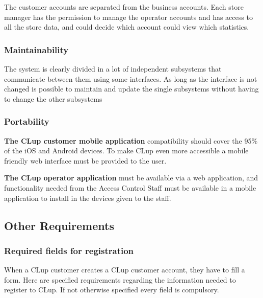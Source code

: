The customer accounts are separated from the business accounts. Each store manager has the permission to manage the operator accounts and has access to all the store data, and could decide which account could view which statistics.
\subsubsection{Maintainability}
The system is clearly divided in a lot of independent subsystems that communicate between them using some interfaces. As long as the interface is not changed is possible to maintain and update the single subsystems without having to change the other subsystems
\subsubsection{Portability}
\textbf{The CLup customer mobile application} compatibility should cover the 95\% of the iOS and Android devices. To make CLup even more accessible a mobile friendly web interface must be provided to the user.

\smallskip

\textbf{The CLup operator application} must be available via a web application, and functionality needed from the Access Control Staff must be available in a mobile application to install in the devices given to the staff.
\subsection{Other Requirements}
\subsubsection{Required fields for registration}
When a CLup customer creates a CLup customer account, they have to fill a form. Here are specified requirements regarding the information needed to register to CLup. If not otherwise specified every field is compulsory.

